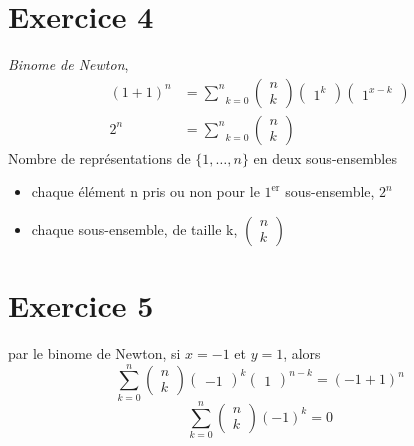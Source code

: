 \documentclass[fontsize=10pt]{article}
\begin{document}
\section*{Exercice 4}
\emph{Binome de Newton},  
\begin{align*}
(1+1)^n &=\underset{k=0}{\overset{n}{\sum}} 
\begin{pmatrix} 
n\\
k
\end{pmatrix}
\begin{pmatrix} 
1^k
\end{pmatrix}
\begin{pmatrix} 
1^{x-k}
\end{pmatrix}\\
2^n&=\underset{k=0}{\overset{n}{\sum}}
\begin{pmatrix} 
n\\
k
\end{pmatrix}
\end{align*}
Nombre de représentations de $\{ 1,\dots,n\}$ en deux sous-ensembles
\begin{itemize}
\item chaque élément n pris ou non pour le $1^{\text{er}}$ sous-ensemble, $2^n$
\item chaque sous-ensemble, de taille k, $
\begin{pmatrix} 
n\\
k
\end{pmatrix}$
\end{itemize}
\section*{Exercice 5}
par le binome de Newton, si $x=-1$ et $y=1$, alors
$$ \underset{k=0}{\overset{n}{\sum}}
\begin{pmatrix} 
n\\
k
\end{pmatrix}
\begin{pmatrix} 
-1
\end{pmatrix}^k
\begin{pmatrix} 
1
\end{pmatrix}^{n-k} = (-1+1)^n$$
$$ \underset{k=0}{\overset{n}{\sum}}
\begin{pmatrix} 
n\\
k
\end{pmatrix}
(-1)^k = 0
$$
\end{document}
